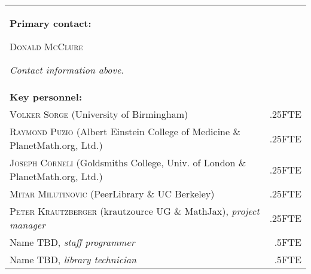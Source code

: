 \documentclass[10pt]{article}
\begin{document}
\bigskip

\begin{tabular}{p{}r}
\textbf{Primary contact:} \par
\textsc{Donald McClure} 
\par \emph{Contact information above.} &  \\[1cm]
\textbf{Key personnel:} &\\
\textsc{Volker Sorge} (University of Birmingham) &.25FTE \\
\textsc{Raymond Puzio} (Albert Einstein College of Medicine \& PlanetMath.org, Ltd.) & .25FTE \\
\textsc{Joseph Corneli} (Goldsmiths College, Univ. of London \& PlanetMath.org, Ltd.) &.25FTE \\
\textsc{Mitar Milutinovic} (PeerLibrary \& UC Berkeley)  &.25FTE \\
\textsc{Peter Krautzberger} (krautzource UG \& MathJax), \emph{project manager}&.25FTE\\
Name TBD, \emph{staff programmer}   &.5FTE \\
Name TBD, \emph{library technician}  &.5FTE \\
\end{tabular}
\end{document}

